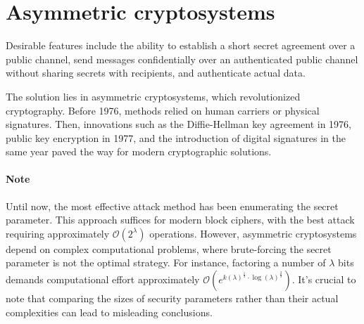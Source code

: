 \section{Asymmetric cryptosystems}

Desirable features include the ability to establish a short secret agreement over a public channel, send messages confidentially over an authenticated public channel without sharing secrets with recipients, and authenticate actual data.

The solution lies in asymmetric cryptosystems, which revolutionized cryptography. Before 1976, methods relied on human carriers or physical signatures. 
Then, innovations such as the Diffie-Hellman key agreement in 1976, public key encryption in 1977, and the introduction of digital signatures in the same year paved the way for modern cryptographic solutions.

\paragraph*{Note}
Until now, the most effective attack method has been enumerating the secret parameter. 
This approach suffices for modern block ciphers, with the best attack requiring approximately $\mathcal{O}(2^\lambda)$ operations.
However, asymmetric cryptosystems depend on complex computational problems, where brute-forcing the secret parameter is not the optimal strategy. 
For instance, factoring a number of $\lambda$ bits demands computational effort approximately $\mathcal{O}\left(e^{k(\lambda)^\frac{1}{3} \cdot \log(\lambda)^\frac{2}{3}}\right)$.
It's crucial to note that comparing the sizes of security parameters rather than their actual complexities can lead to misleading conclusions.

